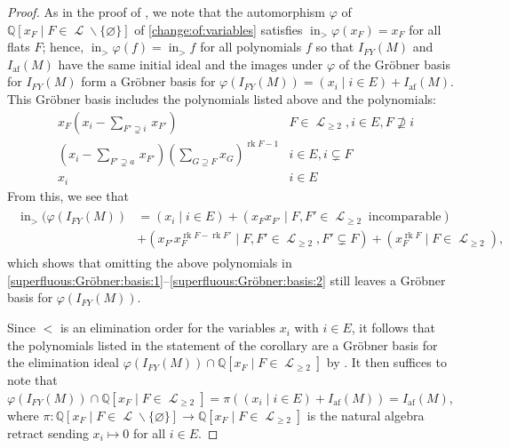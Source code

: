 \documentclass[11pt, reqno]{amsart}
\DeclareMathOperator{\atomfree}{af}
\newcommand{\af}{{\atomfree}}
\renewcommand{\emptyset}{\varnothing}
\DeclareMathOperator{\init}{in}						%
\DeclareMathOperator{\LL}{\mathcal{L}}
\renewcommand{\phi}{\varphi}
\newcommand{\QQ}{\mathbb{Q}}
\DeclareMathOperator{\rk}{rk}
\renewcommand{\setminus}{\smallsetminus}
\theoremstyle{definition}
\numberwithin{equation}{section}
\numberwithin{table}{section}
\begin{document}
\begin{spacing}{1.1}
\begin{proof}
As in the proof of \cite[3.2.2]{BES20}, we note that the automorphism $\phi$ of $\QQ[x_F\mid F \in \LL \setminus \{\emptyset\}]$ of \eqref{change:of:variables} satisfies $\init_> \phi(x_F) = x_F$ for all flats $F$; hence, $\init_> \phi(f) = \init_> f$ for all polynomials $f$ so that $I_{FY}(M)$ and $I_{\mathrm{af}}(M)$ have the same initial ideal and the images under $\phi$ of the Gr\"obner basis for $I_{FY}(M)$ form a Gr\"obner basis for $\phi(I_{FY}(M)) = (x_i \mid i \in E) + I_{\mathrm{af}}(M)$.  This Gr\"obner basis includes the polynomials listed above and the polynomials:
\begin{align} \label{superfluous:Gröbner:basis:1}
&x_F\left(\textstyle x_i - \sum_{F' \supsetneq i} \, x_{F'}\right)& F \in \LL_{\geq 2}, i \in E, F \nsupseteq i \\
\label{superfluous:Gröbner:basis:2}
&\left(\textstyle x_i - \sum_{F' \supsetneq a} \, x_{F'}\right)\left(\textstyle \sum_{G \supseteq F} x_G\right)^{\rk F - 1}& i \in E, i \subsetneq F \\
& x_i & i \in E
\end{align}
From this, we see that 
\begin{align} \label{Chow:ring:initial:ideal} 
\begin{split}
\init_>(\phi(I_{FY}(M)) &= \left(x_i \mid i \in E \right) + \left(x_Fx_{F'} \mid F, F' \in \LL_{\geq 2} \; \text{incomparable}\right) \\
&+ \left(x_{F'}x_F^{\rk F - \rk F'} \mid F, F' \in \LL_{\geq 2}, F' \subsetneq F\right) + \left(x_F^{\rk F} \mid F \in \LL_{\geq 2}\right),
\end{split}
\end{align}
which shows that omitting the above polynomials in \eqref{superfluous:Gröbner:basis:1}--\eqref{superfluous:Gröbner:basis:2} still leaves a Gr\"obner basis for $\phi(I_{FY}(M))$.


Since $<$ is an elimination order for the variables $x_i$ with $i \in E$, it follows that the polynomials listed in the statement of the corollary are a Gr\"obner basis for the elimination ideal $\phi(I_{FY}(M)) \cap \QQ[x_F \mid F \in \LL_{\geq 2}]$ by \cite[3.3]{EH12}.  It then suffices to note that $\phi(I_{FY}(M)) \cap \QQ[x_F \mid F \in \LL_{\geq 2}] = \pi((x_i \mid i \in E) + I_\af(M)) = I_\af(M)$, where $\pi: \QQ[x_F \mid F \in \LL \setminus \{\emptyset\}] \to \QQ[x_F \mid F \in \LL_{\geq 2}]$ is the natural algebra retract sending $x_i \mapsto 0$ for all $i \in E$.
\end{proof}


\end{spacing}
\end{document}
